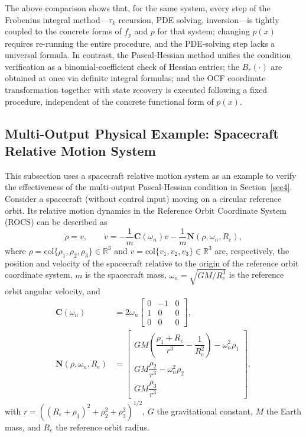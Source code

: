 \documentclass[11pt]{article}
\begin{document}
The above comparison shows that, for the same system, every step of the Frobenius integral method---$\tau_k$ recursion, PDE solving, inversion---is tightly coupled to the concrete forms of $f_p$ and $p$ for that system; changing $p(x)$ requires re-running the entire procedure, and the PDE-solving step lacks a universal formula. In contrast, the Pascal-Hessian method unifies the condition verification as a binomial-coefficient check of Hessian entries; the $B_r(\cdot)$ are obtained at once via definite integral formulas; and the OCF coordinate transformation together with state recovery is executed following a fixed procedure, independent of the concrete functional form of $p(x)$.

\subsection{Multi-Output Physical Example: Spacecraft Relative Motion System}\label{sec5.2}

This subsection uses a spacecraft relative motion system as an example to verify the effectiveness of the multi-output Pascal-Hessian condition in Section~\ref{sec4}. Consider a spacecraft (without control input) moving on a circular reference orbit. Its relative motion dynamics in the Reference Orbit Coordinate System (ROCS) can be described as
\begin{equation}
	\dot{\rho}=v,\qquad 
	\dot{v}=-\frac{1}{m}\mathbf{C}(\omega_n)v-\frac{1}{m}\mathbf{N}(\rho,\omega_n,R_e),
\end{equation}
where $\rho=\mathrm{col}\{\rho_1,\rho_2,\rho_3\}\in\mathbb{R}^3$ and $v=\mathrm{col}\{v_1,v_2,v_3\}\in\mathbb{R}^3$ are, respectively, the position and velocity of the spacecraft relative to the origin of the reference orbit coordinate system, $m$ is the spacecraft mass, $\omega_n=\sqrt{GM/R_e^3}$ is the reference orbit angular velocity, and
\begin{align}
	\mathbf{C}(\omega_n)&=2\omega_n\begin{bmatrix}
		0&-1&0\\
		1&0&0\\
		0&0&0
	\end{bmatrix},\\
	\mathbf{N}(\rho,\omega_n,R_e)&=\begin{bmatrix}
		GM\left(\dfrac{\rho_1+R_e}{r^3}-\dfrac{1}{R_e^2}\right)-\omega_n^2\rho_1\\[6pt]
		GM\dfrac{\rho_2}{r^3}-\omega_n^2\rho_2\\[6pt]
		GM\dfrac{\rho_3}{r^3}
	\end{bmatrix},
\end{align}
with $r=\left((R_e+\rho_1)^2+\rho_2^2+\rho_3^2\right)^{1/2}$, $G$ the gravitational constant, $M$ the Earth mass, and $R_e$ the reference orbit radius.
\end{document}
